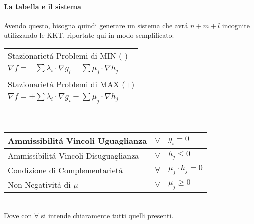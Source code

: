 \documentclass[12pt, a4paper, openany]{book}
\begin{document}
\paragraph{La tabella e il sistema}
Avendo questo, bisogna quindi generare un sistema che avrá $n+m+l$ incognite utilizzando le KKT,
riportate qui in modo semplificato:\\
\begin{tabularx}{\textwidth}{|Y|}
    \hline
    Stazionarietá Problemi di MIN (-)\\
        $ \nabla f = - \sum \lambda_i \cdot \nabla g_i - \sum \mu_j \cdot \nabla h_j$ \\
    \hline \hline
    Stazionarietá Problemi di MAX (+)\\
        $ \nabla f = + \sum \lambda_i \cdot \nabla g_i + \sum \mu_j \cdot \nabla h_j$ \\
    \hline
\end{tabularx}\\
\begin{tabularx}{\textwidth}{|l|cY|}
    \hline
    Ammissibilitá Vincoli Uguaglianza &  $\forall$ & $ g_i = 0$\\
    \hline
    Ammissibilitá Vincoli Disuguaglianza &  $ \forall$ & $ h_j\leq 0$\\
    \hline
    Condizione di Complementarietá & $\forall$ & $ \mu_j \cdot h_j = 0$ \\ 
    \hline
    Non Negativitá di $\mu$ &$\forall $ & $ \mu_j \geq 0$\\
    \hline   
\end{tabularx}
\\Dove con $\forall$ si intende chiaramente tutti quelli presenti.
\end{document}
